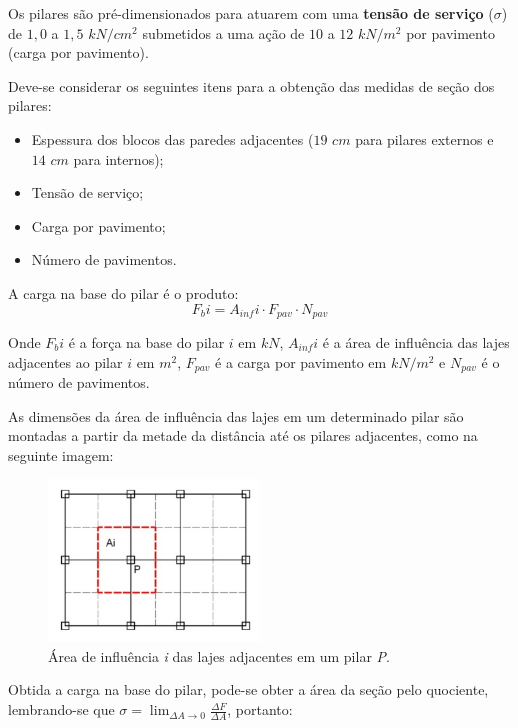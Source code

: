 Os pilares são pré-dimensionados para atuarem com uma \textbf{tensão de serviço} ($\sigma$) de $1,0$ a $1,5$ $kN/cm^2$ submetidos a uma ação de $10$ a $12$ $kN/m^2$ por pavimento (carga por pavimento).

Deve-se considerar os seguintes itens para a obtenção das medidas de seção dos pilares:

\begin{itemize}
	\item Espessura dos blocos das paredes adjacentes ($19$ $cm$ para pilares externos e $14$ $cm$ para internos);
	\item Tensão de serviço;
	\item Carga por pavimento;
	\item Número de pavimentos.
\end{itemize}

A carga na base do pilar é o produto: $$F_bi = A_{inf}i \cdot F_{pav} \cdot N_{pav}$$

Onde $F_bi$ é a força na base do pilar $i$ em $kN$, $A_{inf}i$ é a área de influência das lajes adjacentes ao pilar $i$ em $m^2$, $F_{pav}$ é a carga por pavimento em $kN/m^2$ e $N_{pav}$ é o número de pavimentos.

As dimensões da área de influência das lajes em um determinado pilar são montadas a partir da metade da distância até os pilares adjacentes, como na seguinte imagem:

\begin{figure}[h]
	\begin{center}
    	\includegraphics[width=0.5\textwidth]{Pre-dimensionamento-pilares-macicos/Imagens/Area-de-influencia-das-lajes-nos-pilares.jpg}
    	\caption{Área de influência \textit{i} das lajes adjacentes em um pilar \textit{P}.}
	\end{center}
\end{figure}

Obtida a carga na base do pilar, pode-se obter a área da seção pelo quociente, lembrando-se que $\sigma = \lim_{\Delta A \rightarrow 0} \frac{\Delta F}{\Delta A}$, portanto:

